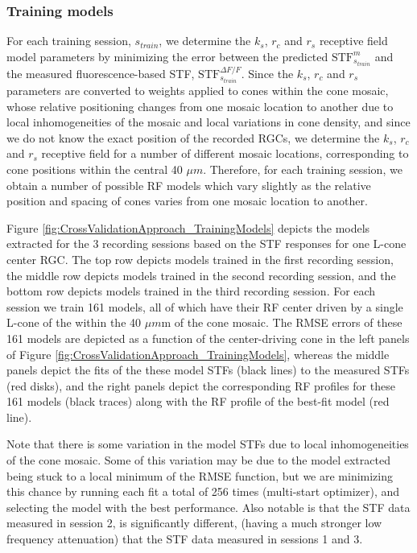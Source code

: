 \documentclass[11pt, oneside]{article}   	%
\begin{document}
\subsubsection{Training models}
For each training session, $s_{train}$, we determine the $k_s$, $r_c$ and $r_s$ receptive field model parameters by minimizing the error between the predicted $\mbox{STF}^{m}_{s_{train}}$ and the measured fluorescence-based STF, $\mbox{STF}^{\Delta F / F}_{s_{train}}$. Since the $k_s$, $r_c$ and $r_s$ parameters are converted to weights applied to cones within the cone mosaic, whose relative positioning changes from one mosaic location to another due to local inhomogeneities of the mosaic and local variations in cone density, and since we do not know the exact position of the recorded RGCs, we determine the $k_s$, $r_c$ and $r_s$ receptive field for a number of different mosaic locations, corresponding to cone positions within the central 40 $\mu m$. Therefore, for each training session, we obtain a number of possible RF models which vary slightly as the relative position and spacing of cones varies from one mosaic location to another.

Figure \ref{fig:CrossValidationApproach_TrainingModels} depicts the models extracted for the 3 recording sessions based on the STF responses for one L-cone center RGC. The top row depicts models trained in the first recording session, the middle row depicts models trained in the second recording session, and the bottom row depicts models trained in the third recording session. For each session we train 161 models, all of which have their RF center driven by a single L-cone of the within the 40 $\mu m$m of the cone mosaic. The RMSE errors of these 161 models are depicted as a function of the center-driving cone in the left panels of Figure \ref{fig:CrossValidationApproach_TrainingModels}, whereas the middle panels depict the fits of the these model STFs (black lines) to the measured STFs (red disks), and the right panels depict the corresponding RF profiles for these 161 models (black traces) along with the RF profile of the best-fit model (red line). 

Note that there is some variation in the model STFs due to local inhomogeneities of the cone mosaic.
Some of this variation may be due to the model extracted being stuck to a local minimum of the RMSE function, but we are minimizing this chance by running each fit a total of 256 times (multi-start optimizer), and selecting the model with the best performance. Also notable is that the STF data measured in session 2, is significantly different, (having a much stronger low frequency attenuation) that the STF data measured in sessions 1 and 3. 
\end{document}
